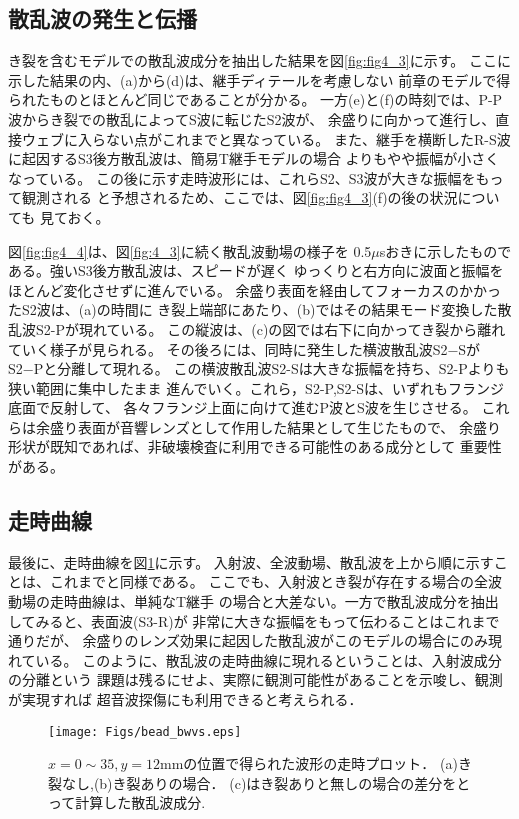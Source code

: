 \subsection{散乱波の発生と伝播}
き裂を含むモデルでの散乱波成分を抽出した結果を図\ref{fig:fig4_3}に示す。
ここに示した結果の内、(a)から(d)は、継手ディテールを考慮しない
前章のモデルで得られたものとほとんど同じであることが分かる。
一方(e)と(f)の時刻では、P-P波からき裂での散乱によってS波に転じたS2波が、
余盛りに向かって進行し、直接ウェブに入らない点がこれまでと異なっている。
また、継手を横断したR-S波に起因するS3後方散乱波は、簡易T継手モデルの場合
よりもやや振幅が小さくなっている。
この後に示す走時波形には、これらS2、S3波が大きな振幅をもって観測される
と予想されるため、ここでは、図\ref{fig:fig4_3}(f)の後の状況についても
見ておく。

図\ref{fig:fig4_4}は、図\ref{fig:4_3}に続く散乱波動場の様子を
0.5$\mu$sおきに示したものである。強いS3後方散乱波は、スピードが遅く
ゆっくりと右方向に波面と振幅をほとんど変化させずに進んでいる。
余盛り表面を経由してフォーカスのかかったS2波は、(a)の時間に
き裂上端部にあたり、(b)ではその結果モード変換した散乱波S2-Pが現れている。
この縦波は、(c)の図では右下に向かってき裂から離れていく様子が見られる。
その後ろには、同時に発生した横波散乱波S2−SがS2−Pと分離して現れる。
この横波散乱波S2-Sは大きな振幅を持ち、S2-Pよりも狭い範囲に集中したまま
進んでいく。これら，S2-P,S2-Sは、いずれもフランジ底面で反射して、
各々フランジ上面に向けて進むP波とS波を生じさせる。
これらは余盛り表面が音響レンズとして作用した結果として生じたもので、
余盛り形状が既知であれば、非破壊検査に利用できる可能性のある成分として
重要性がある。
\subsection{走時曲線}
最後に、走時曲線を図\ref{fig:fig4_5}に示す。
入射波、全波動場、散乱波を上から順に示すことは、これまでと同様である。
ここでも、入射波とき裂が存在する場合の全波動場の走時曲線は、単純なT継手
の場合と大差ない。一方で散乱波成分を抽出してみると、表面波(S3-R)が
非常に大きな振幅をもって伝わることはこれまで通りだが、
余盛りのレンズ効果に起因した散乱波がこのモデルの場合にのみ現れている。
このように、散乱波の走時曲線に現れるということは、入射波成分の分離という
課題は残るにせよ、実際に観測可能性があることを示唆し、観測が実現すれば
超音波探傷にも利用できると考えられる．
\begin{figure}[h]
	\begin{center}
	\texttt{[image: Figs/bead\_bwvs.eps]} 
	\end{center}
	\caption{
		$x=0\sim35, y=12$mmの位置で得られた波形の走時プロット．
		(a)き裂なし,(b)き裂ありの場合．
		(c)はき裂ありと無しの場合の差分をとって計算した散乱波成分.
	} 
	\label{fig:fig4_5}
\end{figure}
